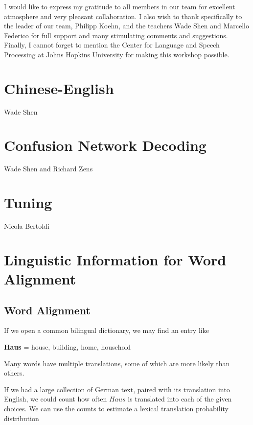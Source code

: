 \documentclass[10pt]{report}
\theoremstyle{plain}
\begin{document}
{{I would like to express my gratitude to all members in our team for excellent
atmosphere and very pleasant collaboration. I also wish to thank specifically to
the leader of our team, Philipp Koehn, and the teachers Wade Shen and Marcello
Federico for full support and many stimulating comments and suggestions.
Finally, I cannot forget to mention the Center for Language and Speech Processing at Johns Hopkins
University for making this workshop possible.


}  %


\section{Chinese-English}
{\sc Wade Shen}

\section{Confusion Network Decoding}
{\sc Wade Shen and Richard Zens}

\section{Tuning}
{\sc Nicola Bertoldi}

\section{Linguistic Information for Word Alignment}

\subsection{Word Alignment\\}

If we open a common bilingual dictionary, we may find an entry
like\\
\begin{center}
\textbf{Haus} = house, building, home, household\\
\end{center}
Many words have multiple translations, some of which are more likely
than others.

If we had a large collection of German text, paired with its
translation into English, we could count how often $Haus$ is
translated into each of the given choices. We can use the counts to
estimate a lexical translation probability distribution

}
\end{document}

